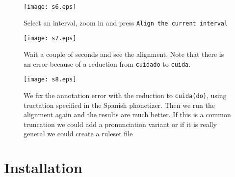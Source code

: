 \begin{figure}[H]
	\centering
	\texttt{[image: s6.eps]}
	\caption{Select an interval, zoom in and press
	\texttt{Align the current interval}}
\end{figure}

\begin{figure}[H]
	\centering
	\texttt{[image: s7.eps]}
	\caption{Wait a couple of seconds and see the alignment. Note that there is
an error because of a reduction from \texttt{cuidado} to \texttt{cuida}.}
\end{figure}

\begin{figure}[H]
	\centering
	\texttt{[image: s8.eps]}
	\caption{We fix the annotation error with the reduction to
\texttt{cuida(do)}, using tructation specified in the Spanish phonetizer. Then
we run the alignment again and the results are much better. If this is a common
truncation we could add a pronunciation variant or if it is really general we
could create a ruleset file}
\end{figure}

\chapter{Installation}
